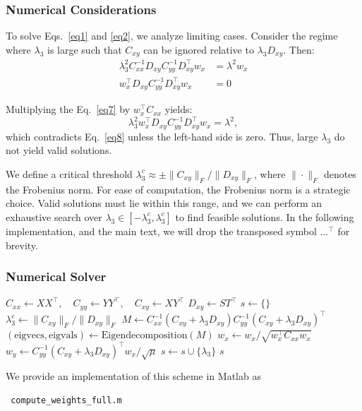 \documentclass{article}
\begin{document}
\subsubsection*{Numerical Considerations}

To solve Eqs.~\eqref{eq1} and \eqref{eq2}, we analyze limiting cases. Consider the regime where $\lambda_3$ is large such that $C_{xy}$ can be ignored relative to $\lambda_3 D_{xy}$. Then:
\begin{align}
\lambda_3^2 C_{xx}^{-1} D_{xy} C_{yy}^{-1} D_{xy}^\top w_x &= \lambda^2 w_x \label{eq7}\\
w_x^\top D_{xy} C_{yy}^{-1} D_{xy}^\top w_x &= 0 \label{eq8}
\end{align}

Multiplying the Eq.~\eqref{eq7} by $w_x^\top C_{xx}$ yields:
\[
\lambda_3^2 w_x^\top D_{xy} C_{yy}^{-1} D_{xy}^\top w_x = \lambda^2,
\]
which contradicts Eq.~\eqref{eq8} unless the left-hand side is zero. Thus, large $\lambda_3$ do not yield valid solutions.

We define a critical threshold $\lambda_3^c \approx \pm \|C_{xy}\|_F / \|D_{xy}\|_F$, where $\|\cdot\|_F$ denotes the Frobenius norm. For ease of computation, the Frobenius norm is a strategic choice. Valid solutions must lie within this range, and we can perform an exhaustive search over $\lambda_3 \in [-\lambda_3^c, \lambda_3^c]$ to find feasible solutions. In the following implementation, and the main text, we will drop the transposed symbol $\dots^\top$ for brevity.

\subsubsection*{Numerical Solver}

\begin{algorithm}[H]
\caption{Full solver for the CRM optimization problem.}\label{alg:full_solver}
\begin{algorithmic}
\State $C_{xx} \gets XX^\top,\quad C_{yy} \gets YY^\top,\quad C_{xy} \gets XY^\top$ 
\State $D_{xy} \gets ST^\top$ 
\State $s \gets \{\}$ 
\State $\lambda_3^c \gets \|C_{xy}\|_F / \|D_{xy}\|_F$ 
    \State $M \gets C_{xx}^{-1}(C_{xy} + \lambda_3 D_{xy}) C_{yy}^{-1}(C_{xy} + \lambda_3 D_{xy})^\top$
    \State $(\text{eigvecs}, \text{eigvals}) \gets \text{Eigendecomposition}(M)$
        \State $w_x \gets w_x / \sqrt{w_x^\top C_{xx} w_x}$ 
        \State $w_y \gets C_{yy}^{-1}(C_{xy} + \lambda_3 D_{xy})^\top w_x / \sqrt{\mu}$ 
            \State $s \gets s \cup \{\lambda_3\}$ 
        \EndIf
    \EndFor
\EndFor
\State \Return $s$
\end{algorithmic}
\end{algorithm}
We provide an implementation of this scheme in Matlab as
\begin{verbatim} compute_weights_full.m \end{verbatim}
\end{document}
